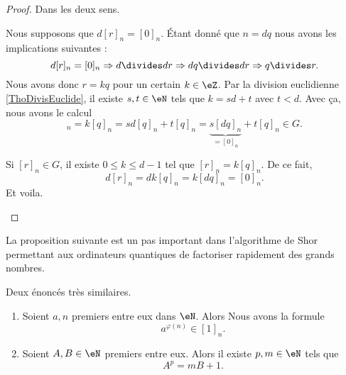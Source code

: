 \begin{proof}
	Dans les deux sens.
	\begin{subproof}
		\spitem[\( \Rightarrow\)]
		Nous supposons que \( d[r]_n=[0]_n\). Étant donné que \( n=dq\) nous avons les implications suivantes :
		\begin{equation}
			d[r]_n=[0]_n\Rightarrow d\divides dr\Rightarrow dq\divides dr\Rightarrow q\divides r.
		\end{equation}
		Nous avons donc \( r=kq\) pour un certain \( k\in \eZ\). Par la division euclidienne \ref{ThoDivisEuclide}, il existe \( s,t\in \eN\) tels que \( k=sd+t\) avec \( t<d\). Avec ça, nous avons le calcul
		\begin{equation}
			[r]_n=k[q]_n=sd[q]_n+t[q]_n=\underbrace{s[dq]_n}_{=[0]_n}+t[q]_n\in G.
		\end{equation}

		\spitem[$\Leftarrow$]
		Si \( [r]_n\in G\), il existe \( 0\leq k\leq d-1\) tel que \( [r]_n=k[q]_n\). De ce fait,
		\begin{equation}
			d[r]_n=dk[q]_n=k[dq]_n=[0]_n.
		\end{equation}
		Et voila.
	\end{subproof}
\end{proof}

La proposition suivante est un pas important dans l'algorithme de Shor permettant aux ordinateurs quantiques de factoriser rapidement des grands nombres\cite{BIBooBBRQooJxksHX}.

\begin{theorem}		\label{THOooXMBSooXrrfOP}
	Deux énoncés très similaires.
	\begin{enumerate}
		\item
		      Soient \( a,n\) premiers entre eux dans \( \eN\). Alors
		      Nous avons la formule
		      \begin{equation}
			      a^{\varphi(n)}\in [1]_n.
		      \end{equation}
		\item		\label{ITEMooJHZBooXVKMlT}
		      Soient \( A,B\in \eN\) premiers entre eux. Alors il existe \( p,m\in \eN\) tels que
		      \begin{equation}
			      A^p=mB+1.
		      \end{equation}
	\end{enumerate}
\end{theorem}

